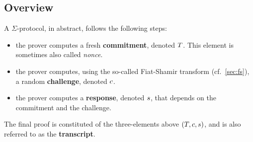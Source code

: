 \documentclass[11pt]{article}
\begin{document}
\subsection{Overview}
A $\Sigma$-protocol, in abstract, follows the following steps:
\begin{itemize}
  \item the prover computes a fresh \textbf{commitment}, denoted $T$. This element is sometimes also called \emph{nonce}.
  \item the prover computes, using the so-called Fiat-Shamir transform (cf.~\cref{sec:fs}), a random \textbf{challenge}, denoted $c$.
  \item the prover computes a \textbf{response}, denoted $s$, that depends on the commitment and the challenge.
\end{itemize}
The final proof is constituted of the three-elements above $(T, c, s)$, and is also referred to as the \textbf{transcript}.
\end{document}
